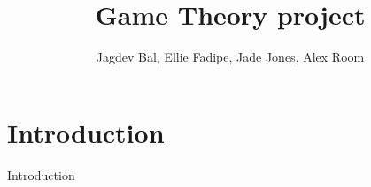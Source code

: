 \documentclass{beamer}
\title{Game Theory project}
\author{Jagdev Bal, Ellie Fadipe, Jade Jones, Alex Room}
\date{}
\begin{document}
\begin{frame}
\titlepage
\end{frame}

\section{Introduction}
\begin{frame}{Introduction}

\end{frame}
\end{document}
